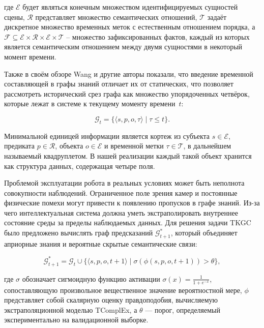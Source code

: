 где $\displaystyle \mathcal{E}$ будет являться конечным множеством идентифицируемых сущностей сцены, $\displaystyle \mathcal{R}$ представляет множество семантических отношений, $\displaystyle \mathcal{T}$ задаёт дискретное множество временных меток с естественным отношением порядка, а $\displaystyle \mathcal{F} \subseteq \mathcal{E} \times \mathcal{R} \times \mathcal{E} \times \mathcal{T}$ – множество зафиксированных фактов, каждый из которых является семантическим отношением между двумя сущностями в некоторый момент времени.

Также в своём обзоре Wang и другие авторы \cite{ref71} показали, что введение временной составляющей в графы знаний отличает их от статических, что позволяет рассмотреть исторический срез графа как множество упорядоченных четвёрок, которые лежат в системе к текущему моменту времени~$\displaystyle t$:

\begin{equation}
    \mathcal{G}_t = \{\langle s, p, o, \tau \rangle \mid \tau \le t\}.
    \label{eq:history_slice}
\end{equation}

Минимальной единицей информации является кортеж из субъекта $\displaystyle s \in \mathcal{E}$, предиката $\displaystyle p \in \mathcal{R}$, объекта $\displaystyle o \in \mathcal{E}$ и временной метки $\displaystyle \tau \in \mathcal{T}$, в дальнейшем называемый квадруплетом. В нашей реализации каждый такой объект хранится как структура данных, содержащая четыре поля.

Проблемой эксплуатации робота в реальных условиях может быть неполнота совокупности наблюдений. Ограниченное поле зрения камер и постоянные физические помехи могут привести к появлению пропусков в графе знаний. Из-за чего интеллектуальная система должна уметь экстраполировать внутреннее состояние среды за пределы наблюдаемых данных. Для решения задачи TKGC \cite{ref74} было предложено вычислять граф предсказаний $\displaystyle \mathcal{G}_{t+1}^*$, который объединяет априорные знания и вероятные скрытые семантические связи:

\begin{equation}
    \mathcal{G}_{t+1}^* = \mathcal{G}_t \cup \{\langle s, p, o, t+1 \rangle \mid \sigma(\phi(s,p,o,t+1)) > \theta \},
    \label{eq:predicted_graph}
\end{equation}

где $\displaystyle \sigma$ обозначает сигмоидную функцию активации $\displaystyle \sigma(x) = \frac{1}{1 + e^{-x}}$, сопоставляющую произвольное вещественное значение вероятностной мере, $\displaystyle \phi$ представляет собой скалярную оценку правдоподобия, вычисляемую экстраполяционной моделью TComplEx, а $\displaystyle \theta$ — порог, определяемый экспериментально на валидационной выборке.

